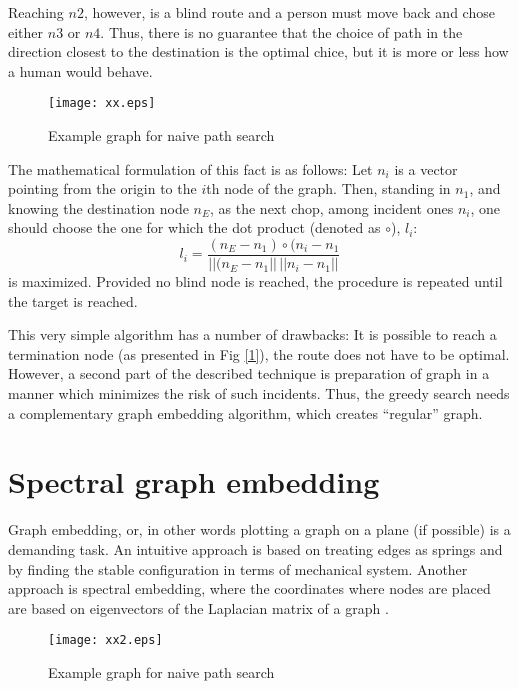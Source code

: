 \documentclass{IEEEtran}
\begin{document}
Reaching $n2$, however, is a blind route and a person 
must move back and chose either $n3$ or $n4$. 
Thus, there is no guarantee that the choice of 
path in the direction closest to the destination
is the optimal chice, but it is more or less how
a human would behave.

\begin{figure}
  \centering
  \texttt{[image: xx.eps]}
  \caption{Example graph for naive path search}
  \label{f1}
\end{figure}

The mathematical formulation of this fact is as follows:
Let $n_i$ is a vector pointing from the origin to the
$i$th node of the graph. Then, standing in $n_1$,
and knowing the destination node $n_E$, as the next
chop, among incident ones $n_i$, one should choose the
one for which the dot product  (denoted as $\circ$), $l_i$:  
\begin{equation}
  \label{eq:2}
  l_i=\frac{(n_E-n_1) \circ (n_i-n_1 }{||(n_E-n_1||\, ||n_i-n_1|| }
\end{equation}
is maximized. Provided no blind node is reached, the procedure is repeated until the 
target is reached. 

This very simple algorithm has a number of drawbacks: It is possible to reach
a termination node (as presented in Fig \ref{1}), the route does not have to be optimal.
 However, a second part of the described technique is preparation of graph 
in a manner which minimizes the risk of such incidents. 
Thus, the greedy search needs a complementary graph embedding algorithm,
which creates ``regular'' graph.

\section{Spectral graph embedding}

Graph embedding, or, in other words plotting a graph on a plane 
(if possible) is a demanding task. An intuitive approach is based
on treating edges as springs and by finding the stable 
configuration in terms of mechanical system. 
Another approach is spectral embedding, where the
coordinates where nodes are placed are based on eigenvectors
of the Laplacian matrix of a graph \cite{lap}.


\begin{figure}[!ht]
  \centering
  \texttt{[image: xx2.eps]}
  \caption{Example graph for naive path search}
  \label{f2}
\end{figure}
\end{document}
